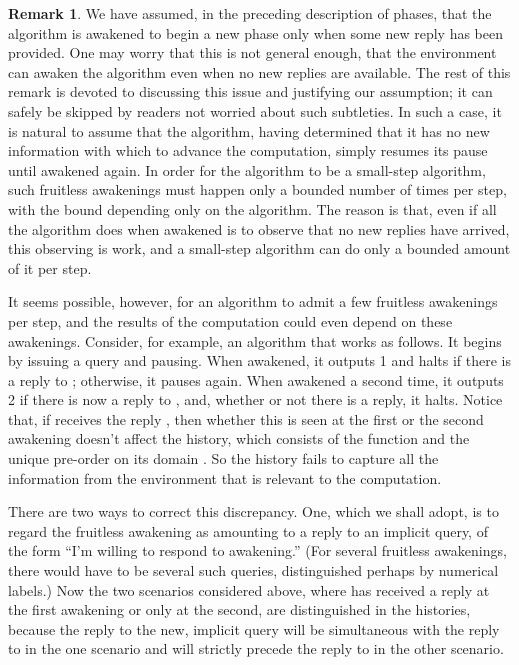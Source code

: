 \documentclass{LMCS}
\theoremstyle{definition}
\newtheorem{rmk}[thm]{Remark}
\begin{document}
\begin{rmk}
  We have assumed, in the preceding description of phases, that the
  algorithm is awakened to begin a new phase only when some new reply
  has been provided.  One may worry that this is not general enough,
  that the environment can awaken the algorithm even when no new
  replies are available.  The rest of this remark is devoted to
  discussing this issue and justifying our assumption; it can safely
  be skipped by readers not worried about such subtleties.
In such a case, it is natural to assume that the
algorithm, having determined that it has no new information with which
to advance the computation, simply resumes its pause until awakened
again.  In order for the algorithm to be a small-step algorithm, such
fruitless awakenings must happen only a bounded number of times per
step, with the bound depending only on the algorithm.  The reason is
that, even if all the algorithm does when awakened is to observe that
no new replies have arrived, this observing is work, and a small-step
algorithm can do only a bounded amount of it per step.

It seems possible, however, for an algorithm to admit a few fruitless
awakenings per step, and the results of the computation could even
depend on these awakenings.  Consider, for example, an algorithm that
works as follows.  It begins by issuing a query  and pausing.  When
awakened, it outputs 1 and halts if there is a reply to ;
otherwise, it pauses again.  When awakened a second time, it outputs 2
if there is now a reply to , and, whether or not there is a reply,
it halts.  Notice that, if  receives the reply , then whether
this is seen at the first or the second awakening doesn't affect the
history, which consists of the function  and the unique
pre-order on its domain .  So the history fails to capture all
the information from the environment that is relevant to the
computation.

There are two ways to correct this discrepancy.  One, which we shall
adopt, is to regard the fruitless awakening as amounting to a reply to
an implicit query, of the form ``I'm willing to respond to
awakening.''  (For several fruitless awakenings, there would have to
be several such queries, distinguished perhaps by numerical labels.)
Now the two scenarios considered above, where  has
received a reply at the first awakening or only at the second, are
distinguished in the histories, because the reply to the new, implicit
query will be simultaneous with the reply to  in the one scenario
and will strictly precede the reply to  in the other scenario.


\end{rmk}
\end{document}
